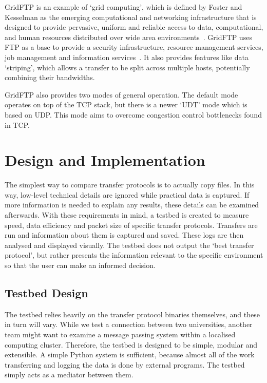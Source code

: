 \documentclass{sig-alternate-05-2015}
\begin{document}
GridFTP is an example of `grid computing', which is defined by Foster and Kesselman as the emerging computational and networking infrastructure that is designed to provide pervasive, uniform and reliable access to data, computational, and human resources distributed over wide area environments~\cite{foster}. GridFTP uses FTP as a base to provide a security infrastructure, resource management services, job management and information services~\cite{allcock2001secure}. It also provides features like data `striping', which allows a transfer to be split across multiple hosts, potentially combining their bandwidths.

GridFTP also provides two modes of general operation. The default mode operates on top of the TCP stack, but there is a newer `UDT' mode which is based on UDP\@. This mode aims to overcome congestion control bottlenecks found in TCP\@. 

\section{Design and Implementation}
The simplest way to compare transfer protocols is to actually copy files. In this way, low-level technical details are ignored while practical data is captured. If more information is needed to explain any results, these details can be examined afterwards. With these requirements in mind, a testbed is created to measure speed, data efficiency and packet size of specific transfer protocols. Transfers are run and information about them is captured and saved. These logs are then analysed and displayed visually. The testbed does not output the `best transfer protocol', but rather presents the information relevant to the specific environment so that the user can make an informed decision.

\subsection{Testbed Design}
The testbed relies heavily on the transfer protocol binaries themselves, and these in turn will vary. While we test a connection between two universities, another team might want to examine a message passing system within a localised computing cluster. Therefore, the testbed is designed to be simple, modular and extensible. A simple Python system is sufficient, because almost all of the work transferring and logging the data is done by external programs. The testbed simply acts as a mediator between them.
\end{document}
